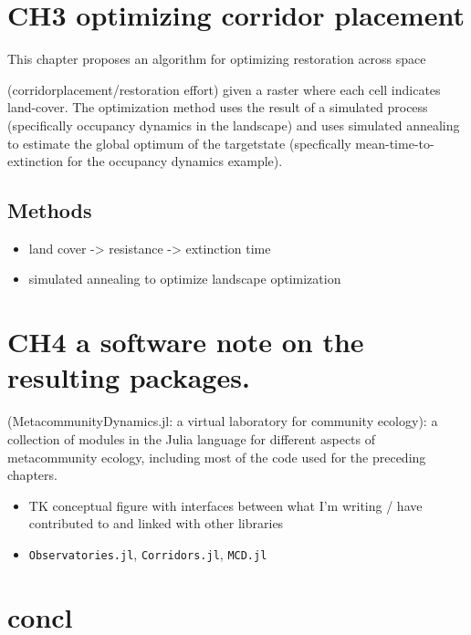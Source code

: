 \documentclass[10pt,oneside]{article}
\begin{document}
\hypertarget{ch3-optimizing-corridor-placement}{%
\section{CH3 optimizing corridor
placement}\label{ch3-optimizing-corridor-placement}}

This chapter proposes an algorithm for optimizing restoration across
space

(corridorplacement/restoration effort) given a raster where each cell
indicates land-cover. The optimization method uses the result of a
simulated process (specifically occupancy dynamics in the landscape) and
uses simulated annealing to estimate the global optimum of the
targetstate (specfically mean-time-to-extinction for the occupancy
dynamics example).

\hypertarget{methods-2}{%
\subsection{Methods}\label{methods-2}}

\begin{itemize}
\tightlist
\item
  land cover -\textgreater{} resistance -\textgreater{} extinction time
\item
  simulated annealing to optimize landscape optimization
\end{itemize}

\hypertarget{ch4-a-software-note-on-the-resulting-packages.}{%
\section{CH4 a software note on the resulting
packages.}\label{ch4-a-software-note-on-the-resulting-packages.}}

(MetacommunityDynamics.jl: a virtual laboratory for community ecology):
a collection of modules in the Julia language for different aspects of
metacommunity ecology, including most of the code used for the preceding
chapters.

\begin{itemize}
\item
  TK conceptual figure with interfaces between what I'm writing / have
  contributed to and linked with other libraries
\item
  \texttt{Observatories.jl}, \texttt{Corridors.jl}, \texttt{MCD.jl}
\end{itemize}

\hypertarget{concl}{%
\section{concl}\label{concl}}
\end{document}

